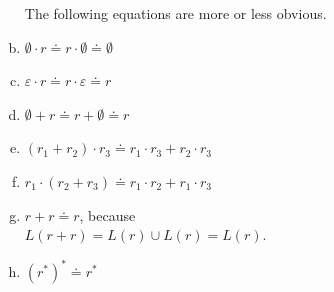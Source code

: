 \begin{enumerate}[(a)]
      The following equations are more or less obvious.
\item $\emptyset \cdot r \doteq r \cdot \emptyset \doteq \emptyset$
\item $\varepsilon \cdot r \doteq r \cdot \varepsilon \doteq r$
\item $\emptyset + r \doteq r + \emptyset \doteq r$
\item $(r_1 + r_2) \cdot r_3 \doteq r_1 \cdot r_3 + r_2 \cdot r_3$
\item $r_1 \cdot (r_2 + r_3) \doteq r_1 \cdot r_2 + r_1 \cdot r_3$
\item $r + r \doteq r$, because
      \\[0.2cm]
      \hspace*{1.3cm}
      $L(r+r) = L(r) \cup L(r) = L(r)$.
\item $(r^*)^* \doteq r^*$      


\end{enumerate}

